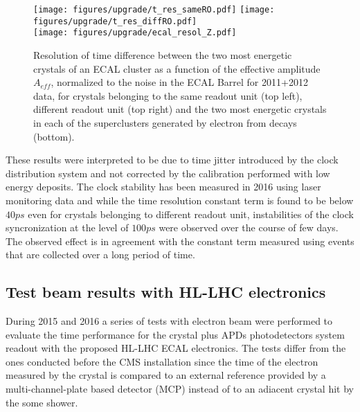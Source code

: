 \begin{figure}[h!]
  \centering
  \texttt{[image: figures/upgrade/t\_res\_sameRO.pdf]}
  \texttt{[image: figures/upgrade/t\_res\_diffRO.pdf]}\\
  \texttt{[image: figures/upgrade/ecal\_resol\_Z.pdf]}
  \caption{Resolution of time difference between the two most energetic crystals of an ECAL cluster as a function of the
    effective amplitude $A_{eff}$, normalized to the noise in the ECAL Barrel for 2011+2012 data,
    for crystals belonging to the same readout unit (top left), different readout unit (top right) and the two most
    energetic crystals in each of the superclusters generated by electron from \Zee decays (bottom).}
  \label{fig:ecal_runI_time}
\end{figure}

These results were interpreted to be due to time jitter introduced by the clock distribution system and not corrected by
the calibration performed with low energy deposits. The clock stability has been measured in 2016 using laser monitoring data
and while the time resolution constant term is found to be below $40 ps$ even for crystals belonging to different readout unit,
instabilities of the clock syncronization at the level of $100 ps$ were observed over the course of few days. The
observed effect is in agreement with the constant term measured using \Zee events that are collected over a long period of time.

\subsection{Test beam results with HL-LHC electronics}
During 2015 and 2016 a series of tests with electron beam were performed to evaluate the time performance
for the \PbWO crystal plus APDs photodetectors system readout with the proposed HL-LHC ECAL electronics.
The tests differ from the ones conducted before the CMS installation since the time of the electron measured by the
crystal is compared to an external reference provided by a multi-channel-plate based detector (MCP) instead of to an adiacent
crystal hit by the some shower. 

